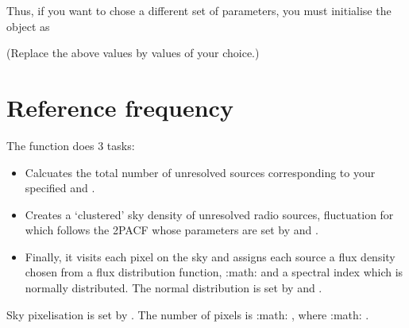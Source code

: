 \documentclass[letterpaper,10pt,english]{sphinxmanual}
\begin{document}
\sphinxAtStartPar
Thus, if you want to chose a different set of parameters, you must
initialise the object as

\sphinxAtStartPar
{}

\sphinxAtStartPar
(Replace the above values by values of your choice.)


\section{Reference frequency}
\label{\detokenize{detexp:reference-frequency}}
\sphinxAtStartPar
The function  does 3 tasks:\sphinxhyphen{}
\begin{itemize}
\item {} 
\sphinxAtStartPar
Calcuates the total number of unresolved sources corresponding to
your specified  and .

\item {} 
\sphinxAtStartPar
Creates a ‘clustered’ sky density of unresolved radio sources,
fluctuation for which follows the 2PACF whose parameters are set by
 and .

\item {} 
\sphinxAtStartPar
Finally, it visits each pixel on the sky and assigns each source a
flux density chosen from a flux distribution function,
:math:  and a
spectral index which is normally distributed. The normal distribution
is set by  and .

\end{itemize}

\sphinxAtStartPar
Sky pixelisation is set by . The number of pixels is
:math: , where :math:  .
\end{document}
